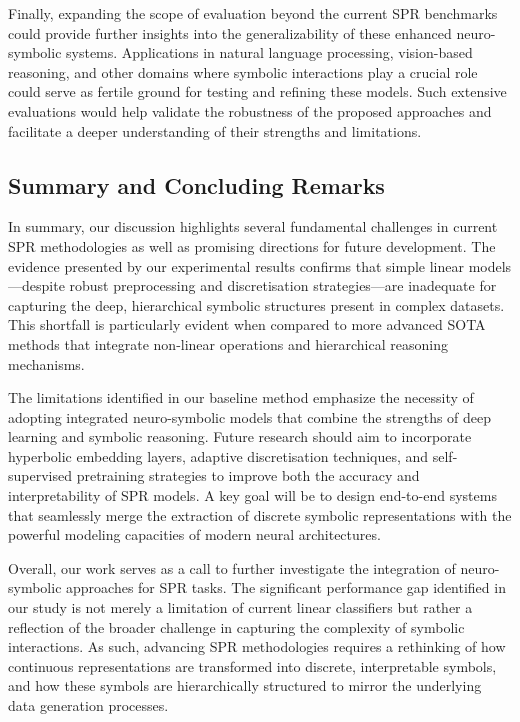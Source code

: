 \documentclass{article}
\begin{document}
Finally, expanding the scope of evaluation beyond the current SPR benchmarks could provide further insights into the generalizability of these enhanced neuro-symbolic systems. Applications in natural language processing, vision-based reasoning, and other domains where symbolic interactions play a crucial role could serve as fertile ground for testing and refining these models. Such extensive evaluations would help validate the robustness of the proposed approaches and facilitate a deeper understanding of their strengths and limitations.

\subsection{Summary and Concluding Remarks}
In summary, our discussion highlights several fundamental challenges in current SPR methodologies as well as promising directions for future development. The evidence presented by our experimental results confirms that simple linear models—despite robust preprocessing and discretisation strategies—are inadequate for capturing the deep, hierarchical symbolic structures present in complex datasets. This shortfall is particularly evident when compared to more advanced SOTA methods that integrate non-linear operations and hierarchical reasoning mechanisms.

The limitations identified in our baseline method emphasize the necessity of adopting integrated neuro-symbolic models that combine the strengths of deep learning and symbolic reasoning. Future research should aim to incorporate hyperbolic embedding layers, adaptive discretisation techniques, and self-supervised pretraining strategies to improve both the accuracy and interpretability of SPR models. A key goal will be to design end-to-end systems that seamlessly merge the extraction of discrete symbolic representations with the powerful modeling capacities of modern neural architectures.

Overall, our work serves as a call to further investigate the integration of neuro-symbolic approaches for SPR tasks. The significant performance gap identified in our study is not merely a limitation of current linear classifiers but rather a reflection of the broader challenge in capturing the complexity of symbolic interactions. As such, advancing SPR methodologies requires a rethinking of how continuous representations are transformed into discrete, interpretable symbols, and how these symbols are hierarchically structured to mirror the underlying data generation processes.
\end{document}
